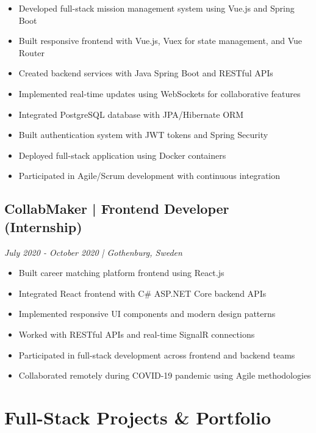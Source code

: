 \documentclass[11pt,a4paper]{article}
\begin{document}
\begin{itemize}[leftmargin=*, itemsep=2pt]
\item Developed full-stack mission management system using Vue.js and Spring Boot
\item Built responsive frontend with Vue.js, Vuex for state management, and Vue Router
\item Created backend services with Java Spring Boot and RESTful APIs
\item Implemented real-time updates using WebSockets for collaborative features
\item Integrated PostgreSQL database with JPA/Hibernate ORM
\item Built authentication system with JWT tokens and Spring Security
\item Deployed full-stack application using Docker containers
\item Participated in Agile/Scrum development with continuous integration
\end{itemize}

\subsection*{CollabMaker | Frontend Developer (Internship)}
\textit{July 2020 - October 2020 | Gothenburg, Sweden}

\begin{itemize}[leftmargin=*, itemsep=2pt]
\item Built career matching platform frontend using React.js
\item Integrated React frontend with C\# ASP.NET Core backend APIs
\item Implemented responsive UI components and modern design patterns
\item Worked with RESTful APIs and real-time SignalR connections
\item Participated in full-stack development across frontend and backend teams
\item Collaborated remotely during COVID-19 pandemic using Agile methodologies
\end{itemize}

\section*{Full-Stack Projects \& Portfolio}
\end{document}
